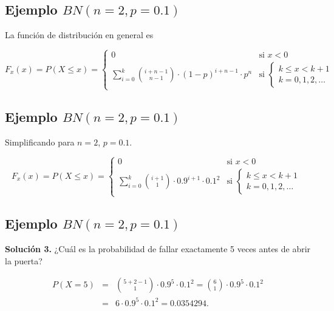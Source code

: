 \documentclass[]{book}
\begin{document}
\hypertarget{ejemplo-bnn2p0.1-2}{%
\subsection{\texorpdfstring{Ejemplo \(BN(n=2,p=0.1)\)}{Ejemplo BN(n=2,p=0.1)}}\label{ejemplo-bnn2p0.1-2}}

La función de distribución en general es

\[
F_x(x)=P(X\leq x)=
\left\{
\begin{array}{ll}
0 & \mbox{si } x<0 \\
\displaystyle\sum_{i=0}^{k }{i+n-1\choose n-1} \cdot (1-p)^{i+n-1}\cdot p^n 
& \mbox{si }\left\{\begin{array}{l} k\leq x< k+1\\k=0,1,2,\ldots\end{array}\right. 
\end{array}
\right.
\]

\hypertarget{ejemplo-bnn2p0.1-3}{%
\subsection{\texorpdfstring{Ejemplo \(BN(n=2,p=0.1)\)}{Ejemplo BN(n=2,p=0.1)}}\label{ejemplo-bnn2p0.1-3}}

Simplificando para \(n=2\), \(p=0.1\).

\[
F_x(x)=P(X\leq x)=
\left\{
\begin{array}{ll}
0 & \mbox{si } x<0 \\
\displaystyle\sum_{i=0}^{k }{i+1\choose 1} \cdot 0.9^{i+1}\cdot 0.1^2
& \mbox{si }\left\{\begin{array}{l} k\leq x< k+1\\k=0,1,2,\ldots\end{array}\right. 
\end{array}
\right.
\]

\hypertarget{ejemplo-bnn2p0.1-4}{%
\subsection{\texorpdfstring{Ejemplo \(BN(n=2,p=0.1)\)}{Ejemplo BN(n=2,p=0.1)}}\label{ejemplo-bnn2p0.1-4}}

\textbf{Solución 3.} ¿Cuál es la probabilidad de fallar exactamente 5 veces antes de abrir la puerta?

\[
\begin{eqnarray*}
P(X=5)&=&{5+2-1\choose 1} \cdot 0.9^{5}\cdot 0.1^2= {6\choose 1} \cdot 0.9^{5}\cdot 0.1^2\\
&=& 6\cdot 0.9^5\cdot 0.1^2= 0.0354294.
\end{eqnarray*}
\]
\end{document}
